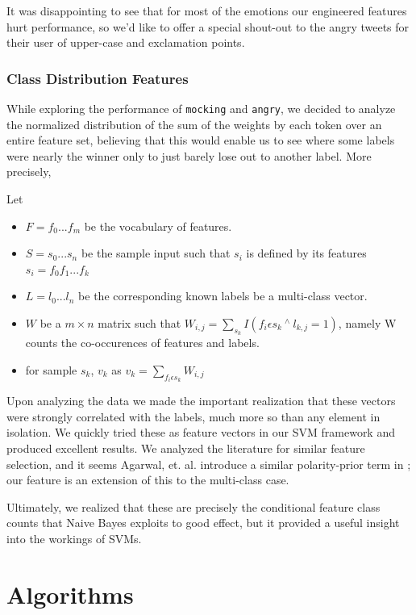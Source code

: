 \documentclass[fontsize=10pt,twocolumn,letterpaper,abstracton]{scrartcl}
\begin{document}
It was disappointing to see that for most of the emotions our engineered features hurt performance, so we'd like to offer a special shout-out to the angry tweets for their user of upper-case and exclamation points.

\subsubsection{Class Distribution Features}

While exploring the performance of \verb|mocking| and \verb|angry|, we decided to analyze the normalized distribution of the sum of the weights by each token over an entire feature set, believing that this would enable us to see where some labels were nearly the winner only to just barely lose out to another label. More precisely,

Let
\begin{itemize}
\item $F = {f_{0}...f_{m}}$ be the vocabulary of features.
\item $S = {s_{0}...s_{n}}$ be the sample input such that $s_{i}$ is defined by its features $s_{i} = f_{0}f_{1}...f_{k}$ 
\item $L = {l_{0}...l_{n}}$ be the corresponding known labels be a multi-class vector.
\item $W$ be a $m \times n$ matrix such that $W_{i,j} = \sum_{s_{k} } I(f_{i} \epsilon s_{k}\ ^{\wedge}\ l_{k,j} = 1)$, namely W counts the co-occurences of features and labels.

\item for sample $s_{k}$, $v_{k}$ as 
$v_{k}=\sum_{f_{i}\epsilon s_{k}} W_{i,j}$
\end{itemize}

Upon analyzing the data we made the important realization that these vectors were strongly correlated with the labels, much more so than any element in isolation. We quickly tried these as feature vectors in our SVM framework and produced excellent results. We analyzed the literature for similar feature selection, and it seems Agarwal, et. al. introduce a similar polarity-prior term in \cite{twsenti}; our feature is an extension of this to the multi-class case.

Ultimately, we realized that these are precisely the conditional feature class counts that Naive Bayes exploits to good effect, but it provided a useful insight into the workings of SVMs.

\section{Algorithms}
\end{document}
